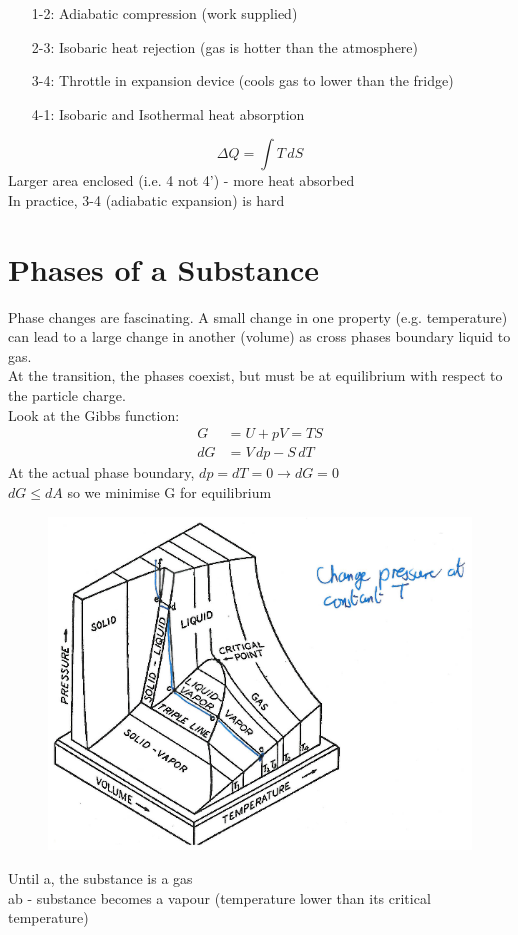 \documentclass[a4paper, 11pt, normalem]{report}
\begin{document}
\begin{itemize}
    \item[1-2:] Adiabatic compression (work supplied)
    \item[2-3:] Isobaric heat rejection (gas is hotter than the atmosphere)
    \item[3-4:] Throttle in expansion device (cools gas to lower than the fridge)
    \item[4-1:] Isobaric and Isothermal heat absorption
\end{itemize}
\begin{equation*}
    \Delta Q = \int T\,dS
\end{equation*}
Larger area enclosed (i.e. 4 not 4') - more heat absorbed \\
In practice, 3-4 (adiabatic expansion) is hard

\section{Phases of a Substance}
Phase changes are fascinating. A small change in one property (e.g. temperature) can lead to a large change in another (volume) as cross phases boundary liquid to gas. \\
At the transition, the phases coexist, but must be at equilibrium with respect to the particle charge. \\
Look at the Gibbs function:
\begin{align*}
    G &= U + pV = TS \\
    dG &= V\,dp - S\,dT
\end{align*}
At the actual phase boundary, $dp = dT = 0 \to dG = 0$ \\
$dG \leq dA$ so we minimise G for equilibrium
\begin{figure}[H]
    \centering
    \includegraphics[scale=0.5]{Phases.png}
\end{figure}
Until a, the substance is a gas \\
ab - substance becomes a vapour (temperature lower than its critical temperature)
\end{document}
